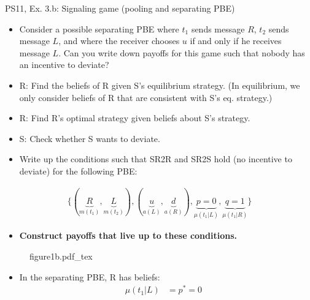 \begin{frame}{PS11, Ex. 3.b: Signaling game (pooling and separating PBE)}
    \begin{itemize}
        \item[(b)] Consider a possible separating PBE where $t_1$ sends message $R$, $t_2$ sends message $L$, and where the receiver chooses $u$ if and only if he receives message $L$. Can you write down payoffs for this game such that nobody has an incentive to deviate?
    \end{itemize} \vspace{-8pt}
    \begin{multicols}{2}
      \begin{itemize}
        \item[SR3:] R: Find the beliefs of R given S's equilibrium strategy. (In equilibrium, we only consider beliefs of R that are consistent with S's eq. strategy.)
        \item[SR2R:] R: Find R's optimal strategy given beliefs about S's strategy.
        \item[SR2S:] S: Check whether S wants to deviate.
        \item[PBE:]  Write up the conditions such that SR2R and SR2S hold (no incentive to deviate) for the following PBE:
      \end{itemize}\vspace{-14pt}
      \begin{align*}
        \{(\underbrace{R}_{m(t_1)},\underbrace{L}_{m(t_2)}),(\underbrace{u}_{a(L)},\underbrace{d}_{a(R)}),\underbrace{p=0}_{\mu(t_1|L)},\underbrace{q=1}_{\mu(t_1|R)}\}
      \end{align*}\vspace{-12pt}
      \begin{itemize}
        \item[$\rightarrow$] \textbf{Construct payoffs that live up to these conditions.}
      \end{itemize}
      \vfill\null\columnbreak
      \begin{figure}[!h]
        \center\def\svgwidth{\columnwidth}
        {figure1b.pdf_tex}
      \end{figure} \vspace{-8pt}
      \begin{itemize}
        \item[SR3:] In the separating PBE, R has beliefs:\vspace{-10pt}
        \begin{align*}
          \mu(t_1|L)&=p^*=0&\\

\end{align*}
\end{itemize}
\end{multicols}
\end{frame}
